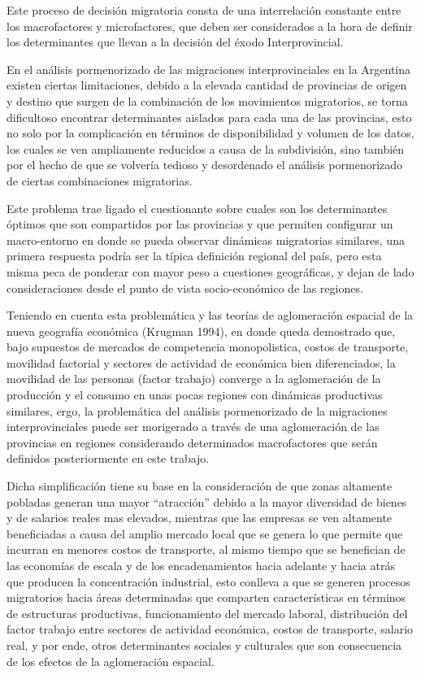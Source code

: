 \documentclass[12pt,a4paper]{article}
\begin{document}
Este proceso de decisión migratoria consta de una interrelación constante entre los macrofactores y microfactores, que deben ser considerados a la hora de definir los determinantes que llevan a la decisión del éxodo Interprovincial.

En el análisis pormenorizado de las migraciones interprovinciales en la Argentina existen ciertas  limitaciones, debido a la elevada cantidad de provincias de origen y destino que surgen de la combinación de los movimientos migratorios, se torna dificultoso encontrar determinantes aislados para cada una de las provincias, esto no solo por la complicación en términos de disponibilidad y volumen de los datos, los cuales se ven ampliamente reducidos a causa de la subdivisión, sino también por el hecho de que se volvería tedioso y desordenado el análisis pormenorizado de ciertas combinaciones migratorias.

Este problema trae ligado el cuestionante sobre cuales son los  determinantes óptimos que son compartidos por las  provincias y  que permiten configurar un macro-entorno en donde se pueda  observar dinámicas migratorias similares, una primera respuesta podría ser la típica definición regional del país, pero esta misma peca de ponderar con mayor peso a cuestiones geográficas, y dejan de lado consideraciones desde el punto de vista socio-económico de las regiones.

Teniendo en cuenta esta problemática y las teorías de aglomeración espacial de la nueva geografía económica (Krugman 1994), en donde queda demostrado que, bajo supuestos de mercados de competencia monopolistica, costos de transporte, movilidad factorial y sectores de actividad de económica bien diferenciados, la movilidad de las personas (factor trabajo) converge a la aglomeración de la producción y el consumo en unas pocas regiones con dinámicas productivas similares, ergo, la problemática del análisis pormenorizado de la migraciones interprovinciales puede ser morigerado a través de una aglomeración de las provincias en regiones considerando determinados macrofactores que serán definidos posteriormente en este trabajo. 

Dicha simplificación tiene su base en la consideración de que  zonas altamente pobladas generan una mayor “atracción” debido a la mayor diversidad de bienes y de salarios reales mas elevados, mientras que las empresas se ven altamente beneficiadas a causa del amplio mercado local que se genera lo que permite que incurran en menores costos de transporte, al mismo tiempo que se benefician de las economías de escala y de los encadenamientos hacia adelante y hacia atrás que producen la concentración industrial, esto conlleva a que se generen procesos migratorios hacia áreas determinadas que comparten características en términos de estructuras productivas, funcionamiento del mercado laboral, distribución del factor trabajo entre sectores de actividad económica, costos de transporte, salario real, y por ende, otros determinantes sociales y culturales que son consecuencia de los efectos de la aglomeración espacial.
\end{document}
